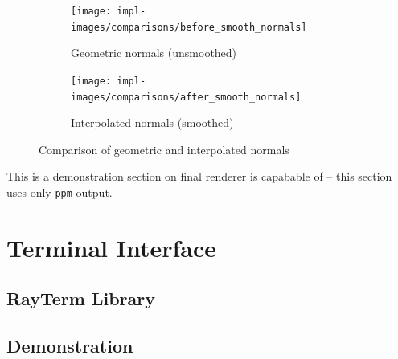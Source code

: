\vspace{0.3em}
\begin{figure}[htb]
  \centering
  \begin{subfigure}[htb]{0.45\textwidth}
    \texttt{[image: impl-images/comparisons/before\_smooth\_normals]}
    \caption{Geometric normals (unsmoothed)}
    \label{fig:rayterm-gpu_unsmoothed_normals}
  \end{subfigure}
  \hspace{1em}
  \begin{subfigure}[htb]{0.45\textwidth}
    \texttt{[image: impl-images/comparisons/after\_smooth\_normals]}
    \caption{Interpolated normals (smoothed)}
    \label{fig:rayterm-gpu_smoothed_normals}
  \end{subfigure}
  \caption{Comparison of geometric and interpolated normals}
  \label{fig:rayterm-gpu_smooth_normal_comparison}
\end{figure}

 \label{ch:methods:renderer:parallel:outcome}

This is a demonstration section on final renderer is capabable of -- this section uses only \texttt{ppm} output.

\section{Terminal Interface} \label{ch:methods:interface}

\subsection{RayTerm Library} \label{ch:methods:interface:rayterm}

 \label{ch:methods:interface:tickit:design}

 \label{ch:methods:interface:tickit:algorithms}

\subsection{Demonstration} \label{ch:methods:interface:demo}
